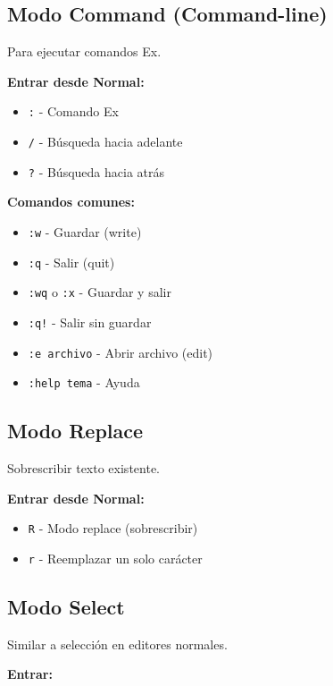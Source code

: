 \documentclass[
  doc,
  floatsintext,
  longtable,
  a4paper,
  nolmodern,
  notxfonts,
  notimes,
  12pt,
  colorlinks=true,linkcolor=blue,citecolor=blue,urlcolor=blue]{apa7}
\providecommand{\tightlist}{%
  \setlength{\itemsep}{0pt}\setlength{\parskip}{0pt}}
\begin{document}
\subsection{Modo Command
(Command-line)}\label{modo-command-command-line}

Para ejecutar comandos Ex.

\textbf{Entrar desde Normal:}

\begin{itemize}
\tightlist
\item
  \texttt{:} - Comando Ex
\item
  \texttt{/} - Búsqueda hacia adelante
\item
  \texttt{?} - Búsqueda hacia atrás
\end{itemize}

\textbf{Comandos comunes:}

\begin{itemize}
\tightlist
\item
  \texttt{:w} - Guardar (write)
\item
  \texttt{:q} - Salir (quit)
\item
  \texttt{:wq} o \texttt{:x} - Guardar y salir
\item
  \texttt{:q!} - Salir sin guardar
\item
  \texttt{:e\ archivo} - Abrir archivo (edit)
\item
  \texttt{:help\ tema} - Ayuda
\end{itemize}

\subsection{Modo Replace}\label{modo-replace}

Sobrescribir texto existente.

\textbf{Entrar desde Normal:}

\begin{itemize}
\tightlist
\item
  \texttt{R} - Modo replace (sobrescribir)
\item
  \texttt{r} - Reemplazar un solo carácter
\end{itemize}

\subsection{Modo Select}\label{modo-select}

Similar a selección en editores normales.

\textbf{Entrar:}
\end{document}
